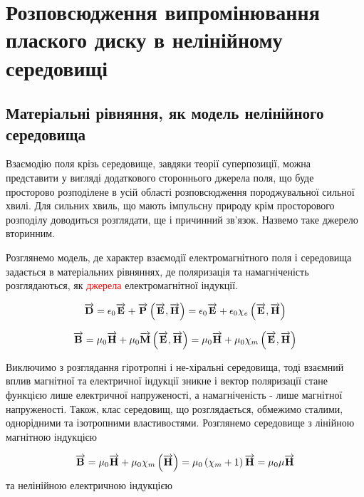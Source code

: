 \chapter{Розповсюдження випромінювання плаского диску в нелінійному середовищі}
\label{ch:nonlinear}

\section{Матеріальні рівняння, як модель нелінійного середовища}

Взаємодію поля крізь середовище, завдяки теорії суперпозиції, можна
представити у вигляді додаткового стороннього джерела поля, що буде 
просторово розподілене в усій області розповсюдження породжувальної 
сильної хвилі. Для сильних хвиль, що мають імпульсну природу 
крім просторового розподілу доводиться розглядати, ще і причинний 
зв'язок. Назвемо таке джерело вторинним.

Розглянемо модель, де характер взаємодії електромагнітного поля і середовища 
задається в матеріальних рівняннях, де поляризація та намагніченість 
розглядаються, як \textcolor{red}{джерела} електромагнітної індукції.

\begin{equation*}
\overrightarrow{\mathbf D} = \epsilon_0 \overrightarrow{\mathbf E} + \overrightarrow{\mathbf P} \left( \overrightarrow{\mathbf E}, \overrightarrow{\mathbf H} \right) =
\epsilon_0 \overrightarrow{\mathbf E} + \epsilon_0 \chi_e \left( \overrightarrow{\mathbf E}, \overrightarrow{\mathbf H} \right)
\end{equation*}

\begin{equation*}
\overrightarrow{\mathbf B} = \mu_0 \overrightarrow{\mathbf H} + \mu_0 \overrightarrow{\mathbf M} \left( \overrightarrow{\mathbf E}, \overrightarrow{\mathbf H} \right) =
\mu_0 \overrightarrow{\mathbf H} + \mu_0 \chi_m \left( \overrightarrow{\mathbf E}, \overrightarrow{\mathbf H} \right)
\end{equation*}

Виключимо з розглядання гіротропні і не-хіральні середовища, тоді взаємний 
вплив магнітної та електричної індукції зникне і вектор поляризації стане 
функцією лише електричної напруженості, а намагніченість - лише магнітної
напруженості. Також, клас середовищ, що розглядається, обмежимо сталими, 
однорідними та ізотропними властивостями. Розглянемо середовище з лінійною 
магнітною індукцією

\begin{equation}
\overrightarrow{\mathbf B} = \mu_0 \overrightarrow{\mathbf H} + \mu_0 \chi_m \left( \overrightarrow{\mathbf H} \right) =
\mu_0 \left( \chi_m + 1 \right) \overrightarrow{\mathbf H} = \mu_0 \mu \overrightarrow{\mathbf H}
\end{equation}
%
та нелінійною електричною індукцією

